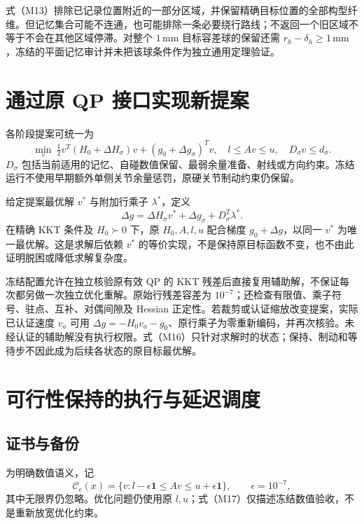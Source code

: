 式（M13）排除已记录位置附近的一部分区域，并保留精确目标位置的全部构型纤维。但记忆集合可能不连通，也可能排除一条必要绕行路线；不返回一个旧区域不等于不会在其他区域停滞。对整个 $1\,\mathrm{mm}$ 目标容差球的保留还需 $r_h-\delta_h\ge1\,\mathrm{mm}$，冻结的平面记忆审计并未把该球条件作为独立通用定理验证。

\section{通过原 QP 接口实现新提案}
各阶段提案可统一为
\begin{equation}
 \min_v\ \tfrac12v^T(H_0+\Delta H_\sigma)v+(g_0+\Delta g_\sigma)^Tv,
 \quad l\le Av\le u,\quad D_\sigma v\le d_\sigma.\tag{M15}
\end{equation}
$D_\sigma$ 包括当前适用的记忆、自碰数值保留、最弱余量准备、射线或方向约束。冻结运行不使用早期额外单侧关节余量惩罚，原硬关节制动约束仍保留。

给定提案最优解 $v^*$ 与附加行乘子 $\lambda^*$，定义
\begin{equation}
 \Delta g=\Delta H_\sigma v^*+\Delta g_\sigma+D_\sigma^T\lambda^*.\tag{M16}
\end{equation}
在精确 KKT 条件及 $H_0\succ0$ 下，原 $H_0,A,l,u$ 配合梯度 $g_0+\Delta g$，以同一 $v^*$ 为唯一最优解。这是求解后依赖 $v^*$ 的等价实现，不是保持原目标函数不变，也不由此证明脱困或降低求解复杂度。

冻结配置允许在独立核验原有效 QP 的 KKT 残差后直接复用辅助解，不保证每次都另做一次独立优化重解。原始行残差容差为 $10^{-7}$；还检查有限值、乘子符号、驻点、互补、对偶间隙及 Hessian 正定性。若裁剪或认证缩放改变提案，实际已认证速度 $v_a$ 可用 $\Delta g=-H_0v_a-g_0$、原行乘子为零重新编码，并再次核验。未经认证的辅助解没有执行权限。式（M16）只针对求解时的状态；保持、制动和等待步不因此成为后续各状态的原目标最优解。

\section{可行性保持的执行与延迟调度}
\subsection{证书与备份}
为明确数值语义，记
\begin{equation}
 \mathcal C_\epsilon(x)=\{v:l-\epsilon\mathbf1\le Av\le u+\epsilon\mathbf1\},\qquad \epsilon=10^{-7},\tag{M17}
\end{equation}
其中无限界仍忽略。优化问题仍使用原 $l,u$；式（M17）仅描述冻结数值验收，不是重新放宽优化约束。

